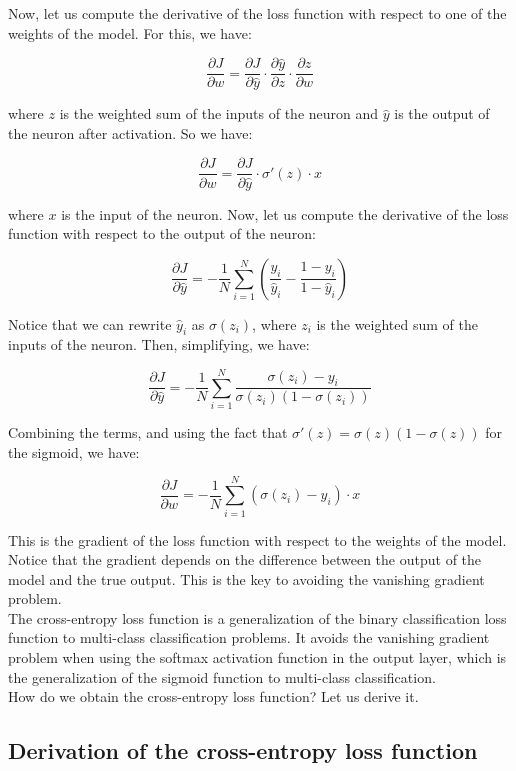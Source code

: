 Now, let us compute the derivative of the loss function with respect to one
of the weights of the model. For this, we have:

$$ \frac{\partial J}{\partial w} = \frac{\partial J}{\partial \hat{y}} \cdot \frac{\partial \hat{y}}{\partial z} \cdot \frac{\partial z}{\partial w}$$
    
where $z$ is the weighted sum of the inputs of the neuron and $\hat{y}$ is the
output of the neuron after activation. So we have:

$$ \frac{\partial J}{\partial w} = \frac{\partial J}{\partial \hat{y}} \cdot \sigma'(z) \cdot x$$

where $x$ is the input of the neuron. Now, let us compute the derivative of the
loss function with respect to the output of the neuron:

$$ \frac{\partial J}{\partial \hat{y}} = -\frac{1}{N} \sum_{i=1}^{N} \left( \frac{y_i}{\hat{y}_i} - \frac{1 - y_i}{1 - \hat{y}_i} \right)$$

Notice that we can rewrite $\hat{y}_i$ as $\sigma(z_i)$, where $z_i$ is the weighted
sum of the inputs of the neuron. Then, simplifying, we have:

$$ \frac{\partial J}{\partial \hat{y}} = -\frac{1}{N} \sum_{i=1}^{N} \frac{\sigma(z_i) - y_i}{\sigma(z_i) (1 - \sigma(z_i))}$$

Combining the terms, and using the fact that $\sigma'(z) = \sigma(z) (1 - \sigma(z))$ 
for the sigmoid, we have:

$$ \frac{\partial J}{\partial w} = -\frac{1}{N} \sum_{i=1}^{N} (\sigma(z_i) - y_i) \cdot x$$

This is the gradient of the loss function with respect to the weights of the model.
Notice that the gradient depends on the difference between the output of the model
and the true output. This is the key to avoiding the vanishing gradient problem.\\

The cross-entropy loss function is a generalization of the binary classification
loss function to multi-class classification problems. It avoids the vanishing
gradient problem when using the softmax activation function in the output layer,
which is the generalization of the sigmoid function to multi-class classification.\\

How do we obtain the cross-entropy loss function? Let us derive it.\\

\subsection{Derivation of the cross-entropy loss function}

